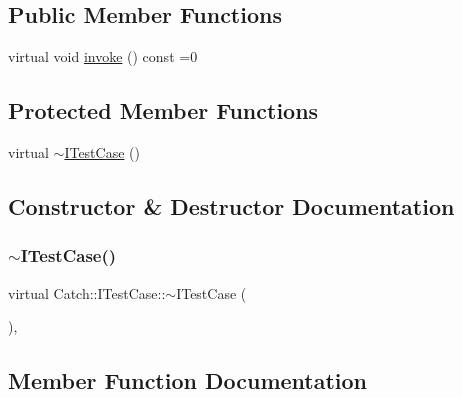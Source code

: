 \subsection*{Public Member Functions}
\begin{DoxyCompactItemize}
\item 
virtual void \hyperlink{struct_catch_1_1_i_test_case_a678825e62e7c17297621cfeb65588c34}{invoke} () const =0
\end{DoxyCompactItemize}
\subsection*{Protected Member Functions}
\begin{DoxyCompactItemize}
\item 
virtual \hyperlink{struct_catch_1_1_i_test_case_add7b9bec455ac1b007c17df82144310e}{$\sim$\+I\+Test\+Case} ()
\end{DoxyCompactItemize}


\subsection{Constructor \& Destructor Documentation}
\mbox{\label{struct_catch_1_1_i_test_case_add7b9bec455ac1b007c17df82144310e}} 
\subsubsection{\texorpdfstring{$\sim$\+I\+Test\+Case()}{~ITestCase()}}
{\footnotesize\ttfamily virtual Catch\+::\+I\+Test\+Case\+::$\sim$\+I\+Test\+Case (\begin{DoxyParamCaption}{ }\end{DoxyParamCaption})\hspace{0.3cm}{\ttfamily [protected]}, {\ttfamily [virtual]}}



\subsection{Member Function Documentation}
\mbox{\label{struct_catch_1_1_i_test_case_a678825e62e7c17297621cfeb65588c34}} 
